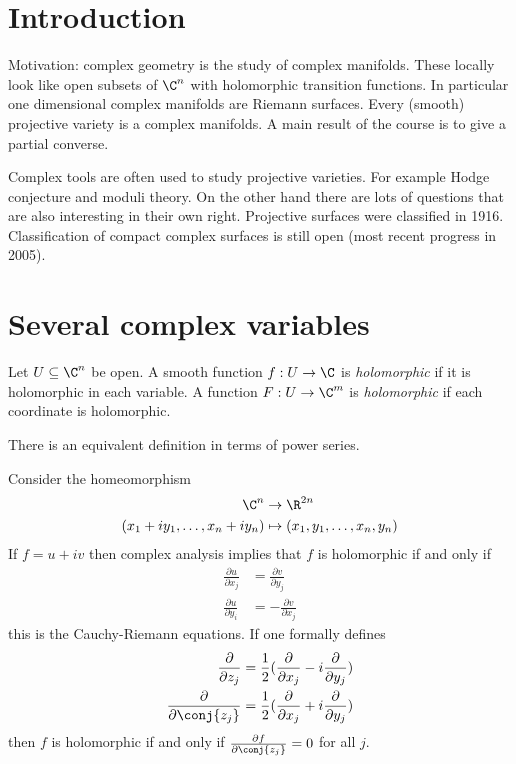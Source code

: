 \documentclass[a4paper]{article}
\begin{document}


\tableofcontents

\setcounter{section}{-1}

\section{Introduction}

Motivation: complex geometry is the study of complex manifolds. These locally look like open subsets of \(\C^n\) with holomorphic transition functions. In particular one dimensional complex manifolds are Riemann surfaces. Every (smooth) projective variety is a complex manifolds. A main result of the course is to give a partial converse.

Complex tools are often used to study projective varieties. For example Hodge conjecture and moduli theory. On the other hand there are lots of questions that are also interesting in their own right. Projective surfaces were classified in 1916. Classification of compact complex surfaces is still open (most recent progress in 2005).

\section{Several complex variables}

\begin{definition}[holomorphic]
  Let \(U \subseteq \C^n\) be open. A smooth function \(f: U \to \C\) is \emph{holomorphic} if it is holomorphic in each variable. A function \(F: U \to \C^m\) is \emph{holomorphic} if each coordinate is holomorphic.
\end{definition}

\begin{remark}
  There is an equivalent definition in terms of power series.
\end{remark}

Consider the homeomorphism
\begin{align*}
  \C^n &\to \R^{2n} \\
  (x_1 + iy_1, \dots, x_n + iy_n) &\mapsto (x_1, y_1, \dots, x_n, y_n)
\end{align*}
If \(f = u + iv\) then complex analysis implies that \(f\) is holomorphic if and only if
\begin{align*}
  \frac{\partial u}{\partial x_j} &= \frac{\partial v}{\partial y_j} \\
  \frac{\partial u}{\partial y_i} &= - \frac{\partial v}{\partial x_j}
\end{align*}
this is the Cauchy-Riemann equations. If one formally defines
\begin{align*}
  \frac{\partial  }{\partial z_j} &= \frac{1}{2}(\frac{\partial  }{\partial x_j} - i \frac{\partial }{\partial y_j}) \\
  \frac{\partial  }{\partial \conj{z_j}} &= \frac{1}{2}(\frac{\partial  }{\partial x_j} + i \frac{\partial }{\partial y_j}) \\
\end{align*}
then \(f\) is holomorphic if and only if \(\frac{\partial f}{\partial \conj{z_j}} = 0\) for all \(j\).
\end{document}

